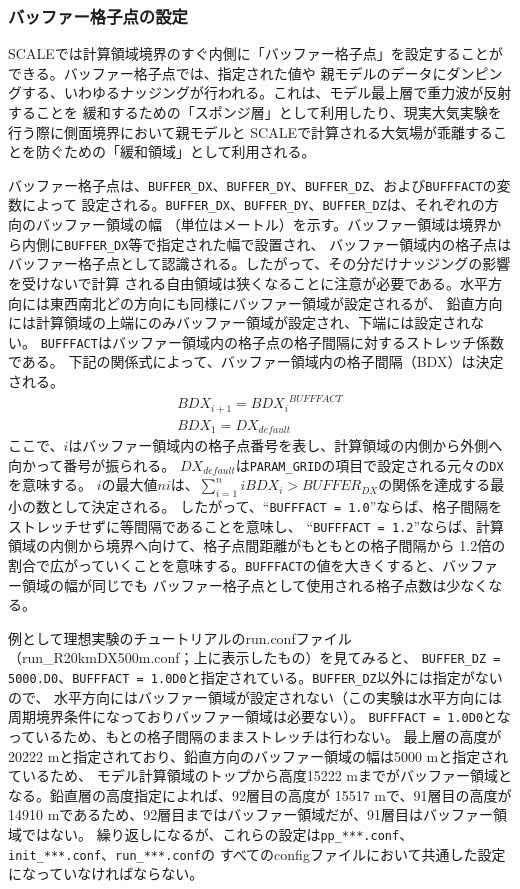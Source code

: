 \subsubsection{バッファー格子点の設定}

SCALEでは計算領域境界のすぐ内側に「バッファー格子点」を設定することができる。バッファー格子点では、指定された値や
親モデルのデータにダンピングする、いわゆるナッジングが行われる。これは、モデル最上層で重力波が反射することを
緩和するための「スポンジ層」として利用したり、現実大気実験を行う際に側面境界において親モデルと
SCALEで計算される大気場が乖離することを防ぐための「緩和領域」として利用される。

バッファー格子点は、\verb|BUFFER_DX|、\verb|BUFFER_DY|、\verb|BUFFER_DZ|、および\verb|BUFFFACT|の変数によって
設定される。\verb|BUFFER_DX|、\verb|BUFFER_DY|、\verb|BUFFER_DZ|は、それぞれの方向のバッファー領域の幅
（単位はメートル）を示す。バッファー領域は境界から内側に\verb|BUFFER_DX|等で指定された幅で設置され、
バッファー領域内の格子点はバッファー格子点として認識される。したがって、その分だけナッジングの影響を受けないで計算
される自由領域は狭くなることに注意が必要である。水平方向には東西南北どの方向にも同様にバッファー領域が設定されるが、
鉛直方向には計算領域の上端にのみバッファー領域が設定され、下端には設定されない。
\verb|BUFFFACT|はバッファー領域内の格子点の格子間隔に対するストレッチ係数である。
下記の関係式によって、バッファー領域内の格子間隔（BDX）は決定される。
\begin{eqnarray}
BDX_{i+1}={BDX_{i}}^{BUFFFACT} \nonumber \\
BDX_{1}=DX_{default} \nonumber
\end{eqnarray}
ここで、$i$はバッファー領域内の格子点番号を表し、計算領域の内側から外側へ向かって番号が振られる。
$DX_{default}$は\verb|PARAM_GRID|の項目で設定される元々の\verb|DX|を意味する。
$i$の最大値$ni$は、$\sum_{i=1}^ni BDX_{i} > BUFFER_{DX}$の関係を達成する最小の数として決定される。
したがって、``\verb|BUFFFACT = 1.0|''ならば、格子間隔をストレッチせずに等間隔であることを意味し、
``\verb|BUFFFACT = 1.2|''ならば、計算領域の内側から境界へ向けて、格子点間距離がもともとの格子間隔から
1.2倍の割合で広がっていくことを意味する。\verb|BUFFFACT|の値を大きくすると、バッファー領域の幅が同じでも
バッファー格子点として使用される格子点数は少なくなる。

例として理想実験のチュートリアルのrun.confファイル（run\_R20kmDX500m.conf；上に表示したもの）を見てみると、
\verb|BUFFER_DZ = 5000.D0|、\verb|BUFFFACT = 1.0D0|と指定されている。\verb|BUFFER_DZ|以外には指定がないので、
水平方向にはバッファー領域が設定されない（この実験は水平方向には周期境界条件になっておりバッファー領域は必要ない）。
\verb|BUFFFACT = 1.0D0|となっているため、もとの格子間隔のままストレッチは行わない。
最上層の高度が20222 mと指定されており、鉛直方向のバッファー領域の幅は5000 mと指定されているため、
モデル計算領域のトップから高度15222 mまでがバッファー領域となる。鉛直層の高度指定によれば、92層目の高度が
15517 mで、91層目の高度が14910 mであるため、92層目まではバッファー領域だが、91層目はバッファー領域ではない。
繰り返しになるが、これらの設定は\verb|pp_***.conf|、\verb|init_***.conf|、\verb|run_***.conf|の
すべてのconfigファイルにおいて共通した設定になっていなければならない。

